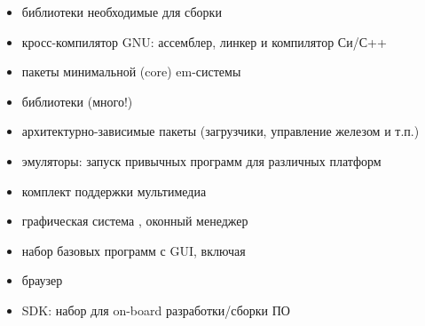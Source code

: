 {\begin{itemize}
  \item библиотеки необходимые для сборки 
  \item кросс-компилятор GNU: ассемблер, линкер и компилятор Си/С++
  \item пакеты минимальной (core) em\linux-системы
  \item библиотеки (много!)
  \item архитектурно-зависимые пакеты (загрузчики, управление железом и т.п.)
  \item эмуляторы: запуск привычных программ для различных платформ
  \item комплект поддержки мультимедиа
  \item графическая система , оконный менеджер
  \item набор базовых программ с GUI, включая
  \item браузер
  \item SDK: набор для on-board разработки/сборки ПО
\end{itemize}


}
